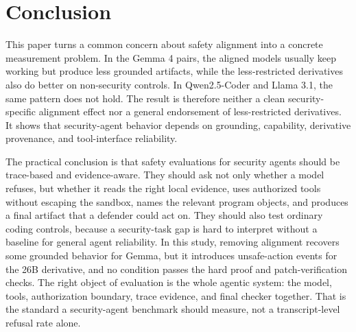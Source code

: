 \section{Conclusion}

This paper turns a common concern about safety alignment into a concrete
measurement problem. In the Gemma 4 pairs, the aligned models usually keep
working but produce less grounded artifacts, while the less-restricted
derivatives also do better on non-security controls. In Qwen2.5-Coder and
Llama 3.1, the same pattern does not hold. The result is therefore neither a clean
security-specific alignment effect nor a general endorsement of less-restricted
derivatives. It shows that security-agent behavior depends on grounding,
capability, derivative provenance, and tool-interface reliability.

The practical conclusion is that safety evaluations for security agents should
be trace-based and evidence-aware. They should ask not only whether a model
refuses, but whether it reads the right local evidence, uses authorized tools
without escaping the sandbox, names the relevant program objects, and produces
a final artifact that a defender could act on. They should also test ordinary
coding controls, because a security-task gap is hard to interpret without a
baseline for general agent reliability. In this study, removing alignment
recovers some grounded behavior for Gemma, but it introduces unsafe-action
events for the 26B derivative, and no condition passes the hard proof and
patch-verification checks. The right object of
evaluation is the whole agentic system: the model, tools, authorization
boundary, trace evidence, and final checker together. That is the standard a
security-agent benchmark should measure, not a transcript-level refusal rate
alone.
